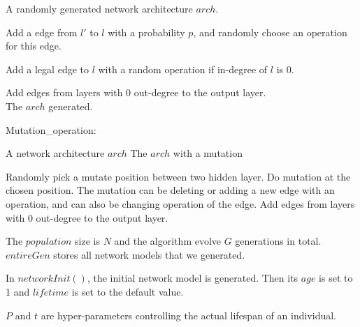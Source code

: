 \documentclass{article}
\begin{document}
\begin{normalsize}
\begin{algorithm}[H]
	
	\begin{algorithmic}[1]  
		\Ensure A randomly generated network architecture $arch$.
		
		\State Add a edge from $l'$ to $l$ with a probability $p$, and randomly choose an operation for this edge.
		\EndFor

				\State  Add a legal edge to $l$ with a random operation if in-degree of $l$ is 0.
		\EndIf

		\EndFor
		
		\State Add edges from layers with 0 out-degree to the output layer.
		\\
		\Return The $arch$ generated.
		
	\end{algorithmic}  
\end{algorithm}  




 \begin{algorithm}[H]  
	\caption{ Mutation\_operation:}
 

	\begin{algorithmic}[1]  
	\Require A network architecture $arch$
	\Ensure The $arch$ with a mutation
	
	
		\State Randomly pick a mutate position between two hidden layer.
		\State Do mutation at the chosen position. The mutation can be deleting or adding a new edge with an operation, and can also be changing operation of the edge.
		\EndWhile
		\State Add edges from layers with 0 out-degree to the output layer.
		
	\end{algorithmic}  
\end{algorithm}  




\end{normalsize}

The $population$ size is $N$ and the algorithm evolve $G$ generations in total. $entireGen$ stores all network models that we generated. 
     
In $networkInit()$, the initial network model is generated. Then its $age $ is set to 1 and $lifetime$ is set to the default value. 

$P$ and $t$ are hyper-parameters controlling the actual lifespan of an individual.





\end{document}
